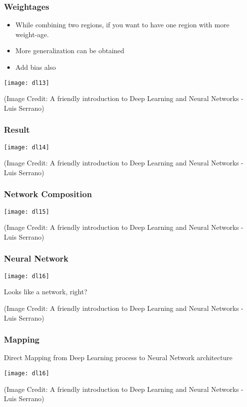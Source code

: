 \begin{frame}[fragile] \frametitle{Weightages}
\begin{itemize}
\item While combining two regions, if you want to have one region with more weight-age.
\item More generalization can be obtained
\item Add bias also
\end{itemize}
\begin{center}
\texttt{[image: dl13]}
\end{center}
{\tiny (Image Credit: A friendly introduction to Deep Learning and Neural Networks -  Luis Serrano)}
\end{frame}

\begin{frame}[fragile] \frametitle{Result}
\begin{center}
\texttt{[image: dl14]}
\end{center}
{\tiny (Image Credit: A friendly introduction to Deep Learning and Neural Networks -  Luis Serrano)}
\end{frame}

\begin{frame}[fragile] \frametitle{Network Composition}
\begin{center}
\texttt{[image: dl15]}
\end{center}
{\tiny (Image Credit: A friendly introduction to Deep Learning and Neural Networks -  Luis Serrano)}
\end{frame}


\begin{frame}[fragile] \frametitle{Neural Network}
\begin{center}
\texttt{[image: dl16]}
\end{center}
Looks like a network, right?

{\tiny (Image Credit: A friendly introduction to Deep Learning and Neural Networks -  Luis Serrano)}
\end{frame}

\begin{frame}[fragile] \frametitle{Mapping}
Direct Mapping from Deep Learning process to Neural Network architecture
\begin{center}
\texttt{[image: dl16]}
\end{center}
{\tiny (Image Credit: A friendly introduction to Deep Learning and Neural Networks -  Luis Serrano)}
\end{frame}


